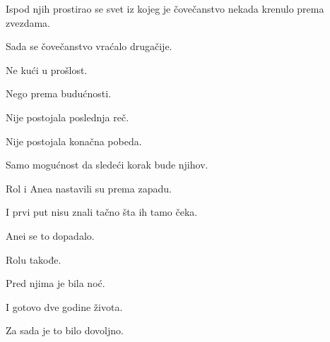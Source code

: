 Ispod njih prostirao se svet iz kojeg je čovečanstvo nekada krenulo prema zvezdama.

\bigskip

Sada se čovečanstvo vraćalo drugačije.

\bigskip

Ne kući u prošlost.

\bigskip

Nego prema budućnosti.

\bigskip

Nije postojala poslednja reč.

\bigskip

Nije postojala konačna pobeda.

\bigskip

Samo mogućnost da sledeći korak bude njihov.

\bigskip

Rol i Anea nastavili su prema zapadu.

\bigskip

I prvi put nisu znali tačno šta ih tamo čeka.

\bigskip

Anei se to dopadalo.

\bigskip

Rolu takođe.

\bigskip

Pred njima je bila noć.

\bigskip

I gotovo dve godine života.

\bigskip

Za sada je to bilo dovoljno.